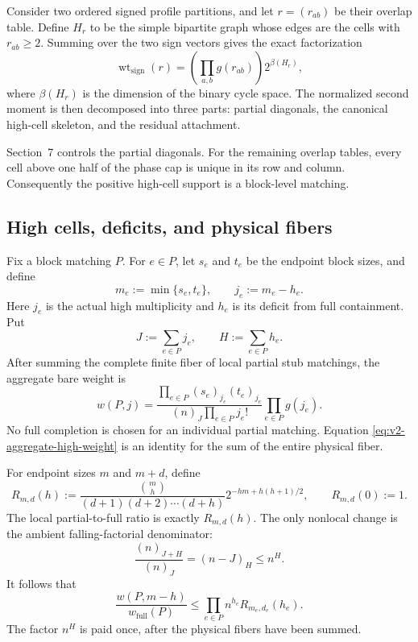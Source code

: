 Consider two ordered signed profile partitions, and let
$r=(r_{ab})$ be their overlap table.  Define $H_r$ to be the simple bipartite
graph whose edges are the cells with $r_{ab}\ge 2$.  Summing over the two sign
vectors gives the exact factorization
\[
  \operatorname{wt}_{\mathrm{sign}}(r)
  =
  \left(\prod_{a,b}g(r_{ab})\right)2^{\beta(H_r)},
\]
where $\beta(H_r)$ is the dimension of the binary cycle space.  The normalized
second moment is then decomposed into three parts: partial diagonals, the
canonical high-cell skeleton, and the residual attachment.

Section~7 controls the partial diagonals.  For the remaining overlap tables,
every cell above one half of the phase cap is unique in its row and column.
Consequently the positive high-cell support is a block-level matching.

\subsection{High cells, deficits, and physical fibers}

Fix a block matching $P$.  For $e\in P$, let $s_e$ and $t_e$ be the endpoint
block sizes, and define
\[
  m_e:=\min\{s_e,t_e\},
  \qquad
  j_e:=m_e-h_e.
\]
Here $j_e$ is the actual high multiplicity and $h_e$ is its deficit from full
containment.  Put
\[
  J:=\sum_{e\in P}j_e,
  \qquad
  H:=\sum_{e\in P}h_e.
\]
After summing the complete finite fiber of local partial stub matchings, the
aggregate bare weight is
\begin{equation}\label{eq:v2-aggregate-high-weight}
  w(P,j)
  =
  \frac{
    \displaystyle\prod_{e\in P}(s_e)_{j_e}(t_e)_{j_e}
  }{
    \displaystyle (n)_J\prod_{e\in P}j_e!
  }
  \prod_{e\in P}g(j_e).
\end{equation}
No full completion is chosen for an individual partial matching.  Equation
\eqref{eq:v2-aggregate-high-weight} is an identity for the sum of the entire
physical fiber.

For endpoint sizes $m$ and $m+d$, define
\[
  R_{m,d}(h)
  :=
  \frac{\binom mh}{(d+1)(d+2)\cdots(d+h)}
  2^{-hm+h(h+1)/2},
  \qquad R_{m,d}(0):=1.
\]
The local partial-to-full ratio is exactly $R_{m,d}(h)$.  The only nonlocal
change is the ambient falling-factorial denominator:
\[
  \frac{(n)_{J+H}}{(n)_J}
  =(n-J)_H
  \le n^H.
\]
It follows that
\begin{equation}\label{eq:v2-global-deficit-comparison}
  \frac{w(P,m-h)}{w_{\mathrm{full}}(P)}
  \le
  \prod_{e\in P}n^{h_e}R_{m_e,d_e}(h_e).
\end{equation}
The factor $n^H$ is paid once, after the physical fibers have been summed.

